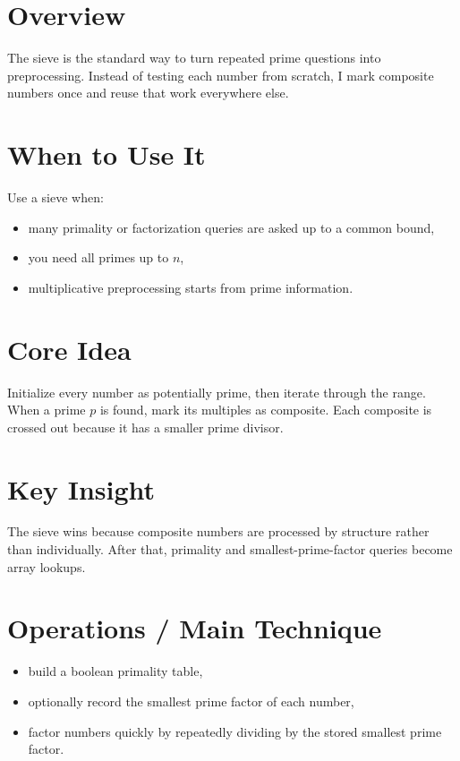 \section*{Overview}

The sieve is the standard way to turn repeated prime questions into preprocessing. Instead of testing each number from
scratch, I mark composite numbers once and reuse that work everywhere else.

\section*{When to Use It}

Use a sieve when:

\begin{itemize}
  \item many primality or factorization queries are asked up to a common bound,
  \item you need all primes up to \(n\),
  \item multiplicative preprocessing starts from prime information.
\end{itemize}

\section*{Core Idea}

Initialize every number as potentially prime, then iterate through the range. When a prime \(p\) is found, mark its
multiples as composite. Each composite is crossed out because it has a smaller prime divisor.

\section*{Key Insight}

The sieve wins because composite numbers are processed by structure rather than individually. After that, primality and
smallest-prime-factor queries become array lookups.

\section*{Operations / Main Technique}

\begin{itemize}
  \item build a boolean primality table,
  \item optionally record the smallest prime factor of each number,
  \item factor numbers quickly by repeatedly dividing by the stored smallest prime factor.
\end{itemize}

